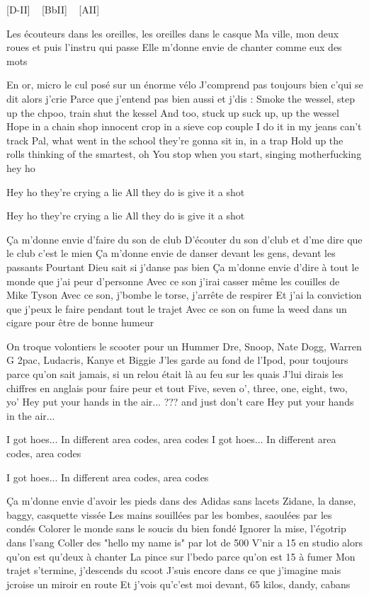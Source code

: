 
[D-II] ~ [BbII] ~ [AII]

 Les écouteurs dans les oreilles, les oreilles dans le casque
Ma ville, mon deux roues et puis l'instru qui passe
Elle m'donne envie de chanter comme eux des mots

En or, micro le cul posé sur un énorme vélo
J'comprend pas toujours bien c'qui se dit alors j'crie
Parce que j'entend pas bien aussi et j'dis :
Smoke the wessel, step up the chpoo, train shut the kessel
And too, stuck up suck up, up the wessel
Hope in a chain shop innocent crop in a sieve cop couple
I do it in my jeans can't track
Pal, what went in the school they're gonna sit in, in a trap
Hold up the rolls thinking of the smartest, oh
You stop when you start, singing motherfucking hey ho

Hey ho they're crying a lie
All they do is give it a shot

Hey ho they're crying a lie
All they do is give it a shot

Ça m'donne envie d'faire du son de club
D'écouter du son d'club et d'me dire que le club c'est le mien
Ça m'donne envie de danser devant les gens, devant les passants Pourtant Dieu sait si j'danse pas bien
Ça m'donne envie d'dire à tout le monde que j'ai peur d'personne
Avec ce son j'irai casser même les couilles de Mike Tyson
Avec ce son, j'bombe le torse, j'arrête de respirer
Et j'ai la conviction que j'peux le faire pendant tout le trajet
Avec ce son on fume la weed dans un cigare pour être de bonne humeur

On troque volontiers le scooter pour un Hummer
Dre, Snoop, Nate Dogg, Warren G
2pac, Ludacris, Kanye et Biggie
J'les garde au fond de l'Ipod, pour toujours parce qu'on sait jamais, si un relou était là au feu sur les quais
J'lui dirais les chiffres en anglais pour faire peur et tout
Five, seven o', three, one, eight, two, yo'
Hey put your hands in the air...
??? and just don't care
Hey put your hands in the air...


I got hoes...
In different area codes, area codes
I got hoes...
In different area codes, area codes

I got hoes...
In different area codes, area codes

Ça m'donne envie d'avoir les pieds dans des Adidas sans lacets
Zidane, la danse, baggy, casquette vissée
Les mains souillées par les bombes, saoulées par les condés
Colorer le monde sans le soucis du bien fondé
Ignorer la mise, l'égotrip dans l'sang
Coller des "hello my name is" par lot de 500
V'nir a 15 en studio alors qu'on est qu'deux à chanter
La pince sur l'bedo parce qu'on est 15 à fumer
Mon trajet s'termine, j'descends du scoot
J'suis encore dans ce que j'imagine mais jcroise un miroir en route
Et j'vois qu'c'est moi devant, 65 kilos, dandy, cabans

